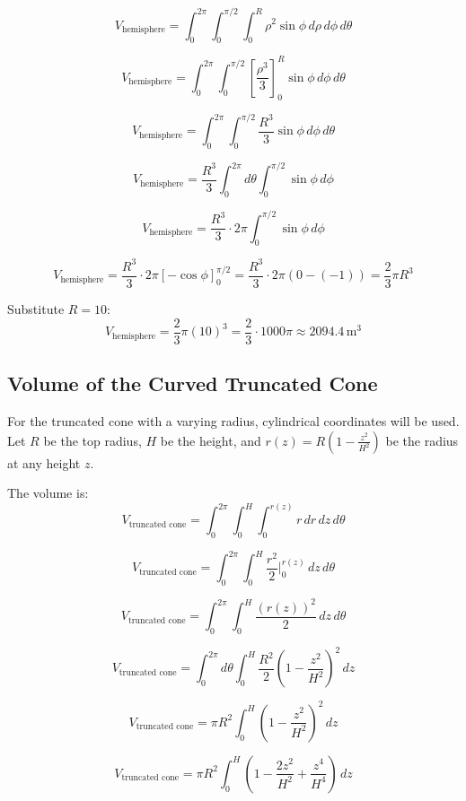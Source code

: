 \documentclass{article}
\begin{document}
\[
V_{\text{hemisphere}} = \int_0^{2\pi} \int_0^{\pi/2} \int_0^R \rho^2 \sin \phi \, d\rho \, d\phi \, d\theta
\]


\[
V_{\text{hemisphere}} = \int_0^{2\pi} \int_0^{\pi/2} \left[ \frac{\rho^3}{3} \right]_0^R \sin \phi \, d\phi \, d\theta
\]

\[
V_{\text{hemisphere}} = \int_0^{2\pi} \int_0^{\pi/2} \frac{R^3}{3} \sin \phi \, d\phi \, d\theta
\]


\[ V_{\text{hemisphere}} =
\frac{R^3}{3} \int_0^{2\pi} d\theta \int_0^{\pi/2} \sin \phi \, d\phi
\]


\[
V_{\text{hemisphere}} = \frac{R^3}{3} \cdot 2\pi \int_0^{\pi/2} \sin \phi \, d\phi
\]


\[
V_{\text{hemisphere}} = \frac{R^3}{3} \cdot 2\pi \left[ -\cos \phi \right]_0^{\pi/2} = \frac{R^3}{3} \cdot 2\pi \left( 0 - (-1) \right) = \frac{2}{3} \pi R^3
\]







Substitute \( R = 10 \):
\[
V_{\text{hemisphere}} = \frac{2}{3} \pi (10)^3 = \frac{2}{3} \cdot 1000 \pi \approx 2094.4 \, \text{m} ^3
\]

\subsection*{Volume of the Curved Truncated Cone}
For the truncated cone with a varying radius, cylindrical coordinates will be used. Let \( R \) be the top radius, \( H \) be the height, and \( r(z) = R \left(1 - \frac{z^2}{H^2}\right) \) be the radius at any height \( z \).

The volume is:
\[
V_{\text{truncated cone}} = \int_0^{2\pi} \int_0^H \int_0^{r(z)} r \, dr \, dz \, d\theta
\]

\[
V_{\text{truncated cone}} = \int_0^{2\pi} \int_0^H  \frac{r^2}{2} \Big|_0^{r(z)} \, dz \, d\theta
\]

\[
V_{\text{truncated cone}} = \int_0^{2\pi} \int_0^H \frac{(r(z))^2}{2} \, dz \, d\theta
\]

\[
V_{\text{truncated cone}} = \int_0^{2\pi} d\theta \int_0^H \frac{R^2}{2} \left(1 - \frac{z^2}{H^2}\right)^2 \, dz
\]

\[
V_{\text{truncated cone}} = \pi R^2 \int_0^H \left(1 - \frac{z^2}{H^2}\right)^2 \, dz
\]


\[
V_{\text{truncated cone}} = \pi R^2 \int_0^H \left(1 - \frac{2z^2}{H^2} + \frac{z^4}{H^4}\right) \, dz
\]
\end{document}
